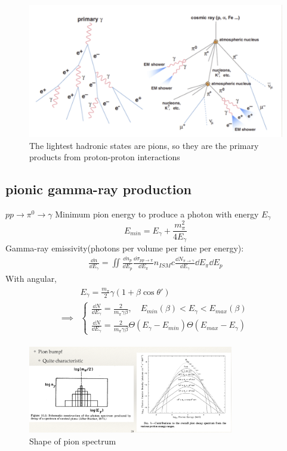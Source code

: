 \documentclass{sciposter}
\begin{document}
\begin{multicols}{3}
\begin{figure}
    \centering 
    \includegraphics[width=1\textwidth]{1.png}
    \caption{The lightest hadronic states are pions, so they are the primary products from proton-proton interactions}
\end{figure}

\subsection{pionic gamma-ray production}
$pp\rightarrow \pi^{0}\rightarrow \gamma $
Minimum pion energy to produce a photon with energy $E_{\gamma} $ $$E_{min}=E_{\gamma} +\frac{m_{\pi}^{2}  }{4E_{\gamma} }$$ 
Gamma-ray emissivity(photons per volume per time per energy):
\begin{align}
    \frac{\dd{n}}{\dd{E_{\gamma} }}=\iint \frac{\dd{n_{p} }}{\dd{E_{p} }}\frac{\dd{\sigma_{pp \rightarrow \pi} }}{\dd{E_{\pi} }}n_{ISM}c\frac{\dd{N_{\pi \rightarrow \gamma} }}{\dd{E_{\gamma} }}\dd{E_{\pi} }\dd{E_{p} } 
 \end{align}
With angular,
\begin{align}
    \begin{aligned}
        &E_{\gamma}=\frac{m_{\pi} }{2}\gamma (1+\beta \cos \theta') \\
        \implies&\begin{cases}
            \frac{\dd{N}}{\dd{E_{\gamma} }}=\frac{2}{m_{\pi} \gamma \beta},\quad E_{min}(\beta)<E_{\gamma}<E_{max}(\beta)  \\
             \frac{\dd{N}}{\dd{E_{\gamma} }}=\frac{2}{m_{\pi} \gamma \beta}\Theta(E_{\gamma}-E_{min}  )\Theta(E_{max}-E_{\gamma}  )
        \end{cases}
    \end{aligned}
\end{align}


\begin{figure}[ht]
    \centering
    \includegraphics[width= 0.8\textwidth]{2.png}
    \caption{\label{fig:2.png2}
        Shape of pion spectrum
    }
\end{figure}

\end{multicols}
\end{document}
